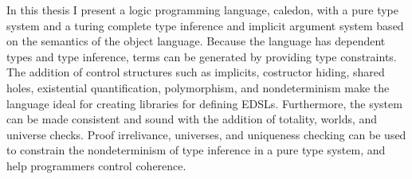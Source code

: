In this thesis I present a logic programming language, caledon, with a pure type system
and a turing complete type inference and implicit argument system based on the semantics of the
object language.  Because the language has dependent types and type inference, terms can be generated 
by providing type constraints.  The addition of control structures such as implicits, costructor hiding,
shared holes, existential quantification, polymorphism, and nondeterminism make the language ideal for 
creating libraries for defining EDSLs.  Furthermore, the system can be made consistent and sound with 
the addition of totality, worlds, and universe checks. Proof irrelivance, universes, and uniqueness 
checking can be used to constrain the nondeterminism of type inference in a pure type system, and help 
programmers control coherence.

